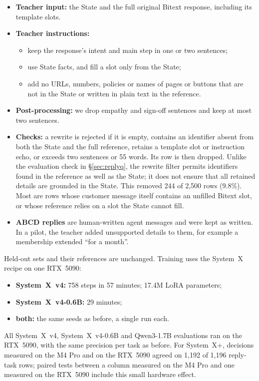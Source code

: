 \documentclass[11pt]{article}
\newcommand{\sysplus}{System~X+}
\newcommand{\sysfour}{System~X~v4}
\newcommand{\sysfoursmall}{System~X~v4-0.6B}
\begin{document}
\begin{itemize}
\item \textbf{Teacher input:} the State and the full original Bitext response, including its template slots.
\item \textbf{Teacher instructions:}
  \begin{itemize}
  \item keep the response's intent and main step in one or two sentences;
  \item use State facts, and fill a slot only from the State;
  \item add no URLs, numbers, policies or names of pages or buttons that are not in the State or written in plain text in the reference.
  \end{itemize}
\item \textbf{Post-processing:} we drop empathy and sign-off sentences and keep at most two sentences.
\item \textbf{Checks:} a rewrite is rejected if it is empty, contains an identifier absent from both the State and the full reference, retains a template slot or instruction echo, or exceeds two sentences or 55 words. Its row is then dropped. Unlike the evaluation check in \S\ref{sec:replyq}, the rewrite filter permits identifiers found in the reference as well as the State; it does not ensure that all retained details are grounded in the State. This removed 244 of 2{,}500 rows (9.8\%). Most are rows whose customer message itself contains an unfilled Bitext slot, or whose reference relies on a slot the State cannot fill.
\item \textbf{ABCD replies} are human-written agent messages and were kept as written. In a pilot, the teacher added unsupported details to them, for example a membership extended ``for a month''.
\end{itemize}
Held-out sets and their references are unchanged. Training uses the System~X recipe on one RTX~5090:
\begin{itemize}
\item \textbf{\sysfour:} 758 steps in 57 minutes; 17.4M LoRA parameters;
\item \textbf{\sysfoursmall:} 29 minutes;
\item \textbf{both:} the same seeds as before, a single run each.
\end{itemize}
All \sysfour{}, \sysfoursmall{} and Qwen3-1.7B evaluations ran on the RTX~5090, with the same precision per task as before. For \sysplus{}, decisions measured on the M4 Pro and on the RTX~5090 agreed on 1{,}192 of 1{,}196 reply-task rows; paired tests between a column measured on the M4 Pro and one measured on the RTX~5090 include this small hardware effect.
\end{document}
